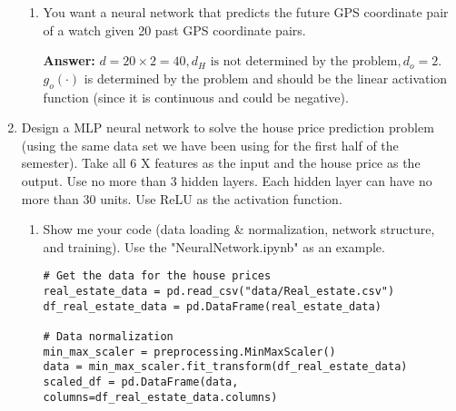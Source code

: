 \documentclass{assignment}
\begin{document}
\begin{problem}
\begin{enumerate}
\begin{enumerate}[label=(\alph*)]

        
        \item You want a neural network that predicts the future GPS coordinate pair of a watch given 20 past GPS coordinate pairs.

        \color{blue}\textbf{Answer:} 
            $d = 20 \times 2 = 40, d_H \text{ is not determined by the problem}, d_o = 2.$\\
            $g_o(\cdot)$ is determined by the problem and should be the linear activation function (since it is continuous and could be negative).
        \color{black}


    \end{enumerate}


    \item Design a MLP neural network to solve the house price prediction problem (using the same data set we have been using for the first half of the semester). Take all 6 X features as the input and the house price as the output. Use no more than 3 hidden layers. Each hidden layer can have no more than 30 units. Use ReLU as the activation function.
    
    \begin{enumerate}[label=(\alph*)]

    
        \item Show me your code (data loading \& normalization, network structure, and training). Use the "NeuralNetwork.ipynb" as an example.\color{blue}\begin{lstlisting}
# Get the data for the house prices
real_estate_data = pd.read_csv("data/Real_estate.csv")
df_real_estate_data = pd.DataFrame(real_estate_data)

# Data normalization
min_max_scaler = preprocessing.MinMaxScaler()
data = min_max_scaler.fit_transform(df_real_estate_data)
scaled_df = pd.DataFrame(data, columns=df_real_estate_data.columns)


\end{lstlisting}
\end{enumerate}
\end{enumerate}
\end{problem}
\end{document}
